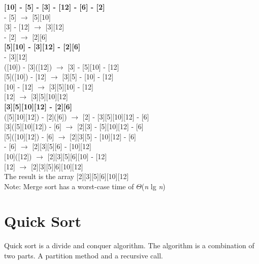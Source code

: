 \documentclass[12pt,a4paper]{article}
\begin{document}
\noindent
\textbf{[10] - [5] - [3] - [12] - [6] - [2]}\\
\indent
[10] - {\color{blue}[5]} $\rightarrow$ {\color{blue}[5][10]}\\
\indent
{\color{blue}[3]} - [12] $\rightarrow$ {\color{blue}[3][12]}\\
\indent
[6] - {\color{blue}[2]}  $\rightarrow$ {\color{blue}[2][6]}\\

\noindent
\textbf{[5][10] - [3][12] - [2][6]}\\
\indent
[5][10] - [3][12]\\
\indent\indent
[5]([10]) - {\color{blue}[3]}([12]) $\rightarrow$ {\color{blue}[3]} - [5][10] - [12]\\
\indent\indent
{\color{blue}[5]}([10]) - [12] $\rightarrow$ {\color{blue}[3][5]} - [10] - [12]\\
\indent\indent
{\color{blue}[10]} - [12] $\rightarrow$ {\color{blue}[3][5][10]} - [12]\\
\indent\indent
{\color{blue}[12]} $\rightarrow$ {\color{blue}[3][5][10][12]}\\

\noindent
\textbf{[3][5][10][12] - [2][6]}\\
\indent
[3]([5][10][12]) - {\color{blue}[2]}([6]) $\rightarrow$ {\color{blue}[2]} - [3][5][10][12] - [6]\\
\indent
{\color{blue}[3]}([5][10][12]) - [6] $\rightarrow$ {\color{blue}[2][3]} - [5][10][12] - [6]\\
\indent
{\color{blue}[5]}([10][12]) - [6] $\rightarrow$ {\color{blue}[2][3][5]} - [10][12] - [6]\\
\indent
[10][12] - {\color{blue}[6]} $\rightarrow$ {\color{blue}[2][3][5][6]} - [10][12]\\
\indent
{\color{blue}[10]}([12]) $\rightarrow$ {\color{blue}[2][3][5][6][10]} - [12]\\
\indent
{\color{blue}[12]} $\rightarrow$ {\color{blue}[2][3][5][6][10][12]}\\

\noindent
The result is the array [2][3][5][6][10][12]\\
\noindent
Note: Merge sort has a worst-case time of $\Theta$(\textit{n} lg \textit{n})

\clearpage

\section{Quick Sort}
Quick sort is a divide and conquer algorithm. The algorithm is a combination of two parts. A partition method and a recursive call. 
\end{document}
